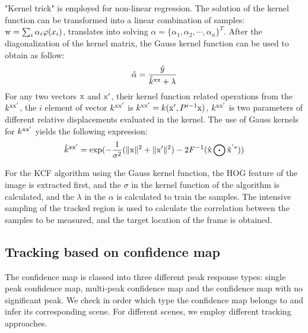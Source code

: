 \documentclass[conference]{IEEEtran}
\begin{document}
"Kernel trick" is employed for non-linear regression.
The solution of the kernel function can be transformed into a linear combination of samples: ${\rm w}=\sum_{i} \alpha_i \varphi(x_i)$, translates into solving $\alpha=\{\alpha_1,\alpha_2,\cdots,\alpha_n\}^T$. After the diagonalization of the kernel matrix, the Gauss kernel function can be used to obtain as follow:
\begin{equation}
	\hat{\alpha}=\frac{\hat{y}}{\hat{k}^{{\rm xx}}+\lambda}
	\label{KCF4}
\end{equation}
For any two vectors ${\rm x}$ and ${\rm x}'$, their kernel function related operations from the $k^{{\rm xx}'}$, the $i$ element of vector $k^{{\rm xx}'}$ is $k^{{\rm xx}'}=k({\rm x}',P^{i-1}{\rm x})$, $k^{{\rm xx}'}$ is two parameters of different relative displacements evaluated in the kernel. The use of Gauss kernels for $k^{{\rm xx}'}$ yields the following expression:
\begin{equation}
	\hat{k}^{{\rm xx'}}={\rm exp}(-\frac{1}{\sigma^2}(\|{\rm x}\|^2+\|{\rm x}'\|^2)-2F^{-1}(\hat{{\rm x}}\bigodot\hat{{\rm x}}^{'*}))
	\label{KCF5}
\end{equation}

For the KCF algorithm using the Gauss kernel function, the HOG feature of the image is extracted first, and the $\sigma$ in the kernel function of the algorithm is calculated, and the $\lambda$ in the $\alpha$ is calculated to train the samples. The intensive sampling of the tracked region is used to calculate the correlation between the samples to be measured, and the target location of the frame is obtained. 

\subsection{Tracking based on confidence map}
The confidence map is classed into three different peak response types: single peak confidence map, multi-peak confidence map and the confidence map with no significant peak.
We check in order which type the confidence map belongs to and infer its corresponding scene.
For different scenes, we employ different tracking approaches.
\end{document}
